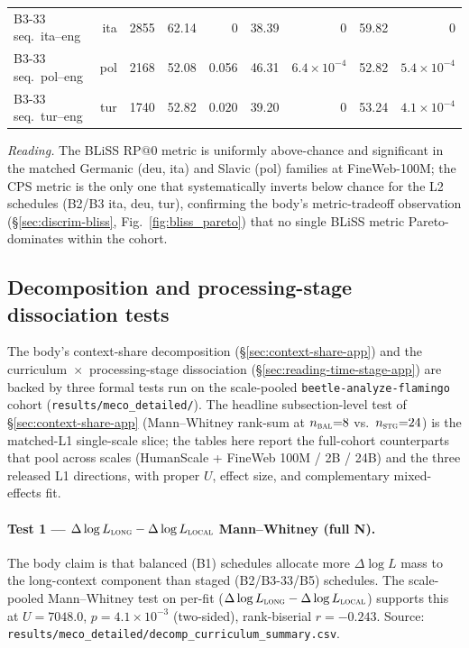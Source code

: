\begin{table}[!ht]
\begin{tabular}{lrrrrrrrr}
    B3-33 seq.\ ita--eng        & ita & 2855 & 62.14 & \textbf{$0$}                  & 38.39 & \textbf{$0$} & 59.82 & \textbf{$0$} \\
    B3-33 seq.\ pol--eng        & pol & 2168 & 52.08 & 0.056                          & 46.31 & \textbf{$6.4{\times}10^{-4}$} & 52.82 & \textbf{$5.4{\times}10^{-4}$} \\
    B3-33 seq.\ tur--eng        & tur & 1740 & 52.82 & \textbf{$0.020$}              & 39.20 & \textbf{$0$} & 53.24 & \textbf{$4.1{\times}10^{-4}$} \\
    \bottomrule
  \end{tabular}
\end{table}

\emph{Reading.} The BLiSS RP$@0$ metric is uniformly above-chance and significant in the matched Germanic (deu, ita) and Slavic (pol) families at FineWeb-100M; the CPS metric is the only one that systematically inverts below chance for the L2 schedules (B2/B3 ita, deu, tur), confirming the body's metric-tradeoff observation (\S\ref{sec:discrim-bliss}, Fig.~\ref{fig:bliss_pareto}) that no single BLiSS metric Pareto-dominates within the \beetle{} cohort.

\subsection{Decomposition and processing-stage dissociation tests}\label{sec:sig-decomp}

The body's context-share decomposition (\S\ref{sec:context-share-app}) and the curriculum~$\times$~processing-stage dissociation (\S\ref{sec:reading-time-stage-app}) are backed by three formal tests run on the scale-pooled \texttt{beetle-analyze-flamingo} cohort (\texttt{results/meco\_detailed/}). The headline subsection-level test of \S\ref{sec:context-share-app} (Mann--Whitney rank-sum at $n_\textsc{bal}{=}8$ vs.\ $n_\textsc{stg}{=}24$) is the matched-L1 single-scale slice; the tables here report the full-cohort counterparts that pool across scales (HumanScale + FineWeb 100M / 2B / 24B) and the three released L1 directions, with proper $U$, effect size, and complementary mixed-effects fit.

\paragraph{Test 1 --- $\Delta\log L_\textsc{long} - \Delta\log L_\textsc{local}$ Mann--Whitney (full N).} The body claim is that balanced (B1) schedules allocate more $\Delta\log L$ mass to the long-context component than staged (B2/B3-33/B5) schedules. The scale-pooled Mann--Whitney test on per-fit ($\Delta\log L_\textsc{long} - \Delta\log L_\textsc{local}$) supports this at $U = 7048.0$, $p = 4.1{\times}10^{-3}$ (two-sided), rank-biserial $r = -0.243$. Source: \texttt{results/meco\_detailed/decomp\_curriculum\_summary.csv}.

